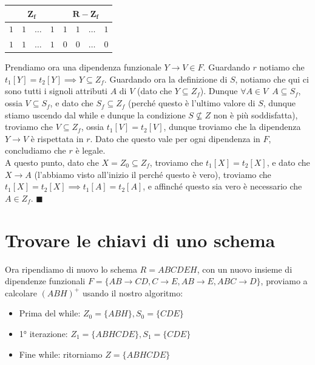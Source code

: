 \documentclass[11pt, a4paper, titlepage, oneside]{scrbook}
\begin{document}
\begin{itemize}
\begin{center}
    \begin{tabular}{|c|c|c|c|c|c|c|c|}
    \hline
    \multicolumn{4}{|c|}{$\bm{Z_f}$} & \multicolumn{4}{c|}{$\bm{R - Z_f}$}\\ \hline
    $1$ & $1$ & $\dots$ & $1$ & $1$ & $1$ & $\dots$ & $1$\\
    $1$ & $1$ & $\dots$ & $1$ & $0$ & $0$ & $\dots$ & $0$\\ \hline
    \end{tabular}
    \end{center}

    Prendiamo ora una dipendenza funzionale $Y \longrightarrow V \in F$. Guardando $r$ notiamo che $t_1[Y] = t_2[Y] \implies Y \subseteq Z_f$. Guardando ora la definizione di $S$, notiamo che qui ci sono tutti i signoli attributi $A$ di $V$ (dato che $Y \subseteq Z_f$). Dunque $\forall A \in V \enspace A \subseteq S_f$, ossia $V \subseteq S_f$, e dato che $S_f \subseteq Z_f$ (perché questo è l'ultimo valore di $S$, dunque stiamo uscendo dal while e dunque la condizione $S \nsubseteq Z$ non è più soddisfatta), troviamo che $V \subseteq Z_f$, ossia $t_1[V] = t_2[V]$, dunque troviamo che la dipendenza $Y \longrightarrow V$ è rispettata in $r$. Dato che questo vale per ogni dipendenza in $F$, concludiamo che $r$ è legale. \\
    A questo punto, dato che $X = Z_0 \subseteq Z_f$, troviamo che $t_1[X] = t_2[X]$, e dato che $X \longrightarrow A$ (l'abbiamo visto all'inizio il perché questo è vero), troviamo che $t_1[X] = t_2[X] \implies t_1[A] = t_2[A]$, e affinché questo sia vero è necessario che $A \in Z_f$. $\blacksquare$   
\end{itemize}

\section{Trovare le chiavi di uno schema}

Ora ripendiamo di nuovo lo schema $R = ABCDEH$, con un nuovo insieme di dipendenze funzionali  $F = \{AB \longrightarrow CD, C \longrightarrow E, AB \longrightarrow E, ABC \longrightarrow D\}$, proviamo a calcolare $(ABH)^+$ usando il nostro algoritmo:

\begin{itemize}
    \item Prima del while: $Z_0 = \{ABH\}, S_0 = \{CDE\}$
    \item 1° iterazione: $Z_1 = \{ABHCDE\}, S_1 = \{CDE\}$
    \item Fine while: ritorniamo $Z = \{ABHCDE\}$
\end{itemize}
\end{document}
